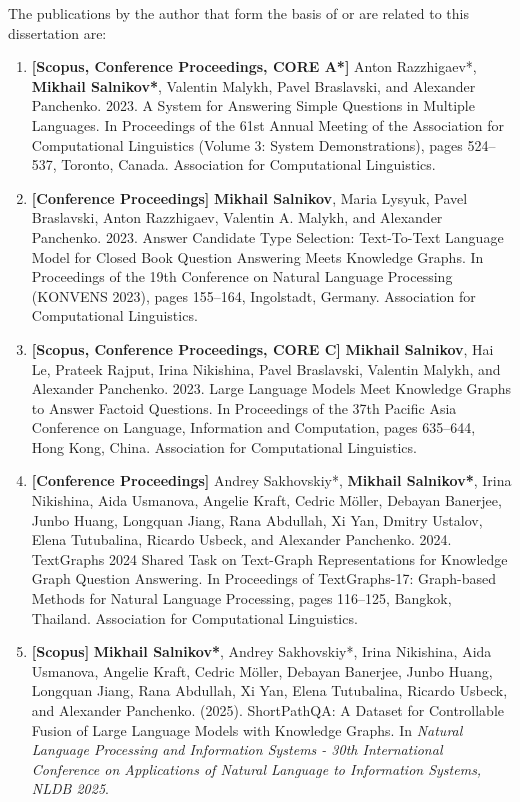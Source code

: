 The publications by the author that form the basis of or are related to this dissertation are:
\begin{enumerate}
    \item \textbf{[Scopus, Conference Proceedings, CORE A*]} Anton Razzhigaev*, \textbf{Mikhail Salnikov*}, Valentin Malykh, Pavel Braslavski, and Alexander Panchenko. 2023. A System for Answering Simple Questions in Multiple Languages. In Proceedings of the 61st Annual Meeting of the Association for Computational Linguistics (Volume 3: System Demonstrations), pages 524–537, Toronto, Canada. Association for Computational Linguistics.
    \item \textbf{[Conference Proceedings]} \textbf{Mikhail Salnikov}, Maria Lysyuk, Pavel Braslavski, Anton Razzhigaev, Valentin A. Malykh, and Alexander Panchenko. 2023. Answer Candidate Type Selection: Text-To-Text Language Model for Closed Book Question Answering Meets Knowledge Graphs. In Proceedings of the 19th Conference on Natural Language Processing (KONVENS 2023), pages 155–164, Ingolstadt, Germany. Association for Computational Linguistics. 
    \item \textbf{[Scopus, Conference Proceedings, CORE C]} \textbf{Mikhail Salnikov}, Hai Le, Prateek Rajput, Irina Nikishina, Pavel Braslavski, Valentin Malykh, and Alexander Panchenko. 2023. Large Language Models Meet Knowledge Graphs to Answer Factoid Questions. In Proceedings of the 37th Pacific Asia Conference on Language, Information and Computation, pages 635–644, Hong Kong, China. Association for Computational Linguistics.
    \item \textbf{[Conference Proceedings]} Andrey Sakhovskiy*, \textbf{Mikhail Salnikov*}, Irina Nikishina, Aida Usmanova, Angelie Kraft, Cedric Möller, Debayan Banerjee, Junbo Huang, Longquan Jiang, Rana Abdullah, Xi Yan, Dmitry Ustalov, Elena Tutubalina, Ricardo Usbeck, and Alexander Panchenko. 2024. TextGraphs 2024 Shared Task on Text-Graph Representations for Knowledge Graph Question Answering. In Proceedings of TextGraphs-17: Graph-based Methods for Natural Language Processing, pages 116–125, Bangkok, Thailand. Association for Computational Linguistics.
    \item \textbf{[Scopus]} \textbf{Mikhail Salnikov*}, Andrey Sakhovskiy*, Irina Nikishina, Aida Usmanova, Angelie Kraft, Cedric Möller, Debayan Banerjee, Junbo Huang, Longquan Jiang, Rana Abdullah, Xi Yan, Elena Tutubalina, Ricardo Usbeck, and Alexander Panchenko. (2025). ShortPathQA: A Dataset for Controllable Fusion of Large Language Models with Knowledge Graphs. In \textit{Natural Language Processing and Information Systems - 30th International Conference on Applications of Natural Language to Information Systems, NLDB 2025}.

\end{enumerate}
